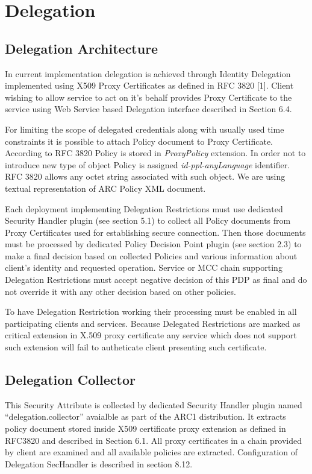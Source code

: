 \documentclass{article}                            %
\begin{document}



\section{Delegation} %
\label{sec:delegation}

\subsection{Delegation Architecture} %
\label{subsec:delegation_arch}
In current implementation delegation is achieved through Identity Delegation implemented using X509 Proxy Certificates as defined in RFC 3820 [1]. Client wishing to allow service to act on it's behalf provides Proxy Certificate to the service using Web Service based Delegation interface described in Section 6.4.

For limiting the scope of delegated credentials along with usually used time constraints it is possible to attach Policy document to Proxy Certificate. According to RFC 3820 Policy is stored in \textit{ProxyPolicy} extension. In order not to introduce new type of object Policy is assigned \textit{id-ppl-anyLanguage} identifier. RFC 3820 allows any octet string associated with such object. We are using textual representation of ARC Policy XML document.

Each deployment implementing Delegation Restrictions must use dedicated Security Handler plugin (see section 5.1) to collect all Policy documents from Proxy Certificates used for establishing secure connection. Then those documents must be processed by dedicated Policy Decision Point plugin (see section 2.3) to make a final decision based on collected Policies and various information about client's identity and requested operation. Service or MCC chain supporting Delegation Restrictions must accept negative decision of this PDP as final and do not override it with any other decision based on other policies.

To have Delegation Restriction working their processing must be enabled in all participating clients and services. Because Delegated Restrictions are marked as critical extension in X.509 proxy certificate any  service which does not support such extension will fail to autheticate client presenting such certificate.

\subsection{Delegation Collector} %
\label{subsec:delegation_collector}
This Security Attribute is collected by dedicated Security Handler plugin named ``delegation.collector'' avaialble as part of the ARC1 distribution. It extracts policy document stored inside X509 certificate proxy extension as defined in RFC3820 and described in Section 6.1. All proxy certificates in a chain provided by client are examined and all available policies are extracted. Configuration of Delegation SecHandler is described in section 8.12.
\end{document}
